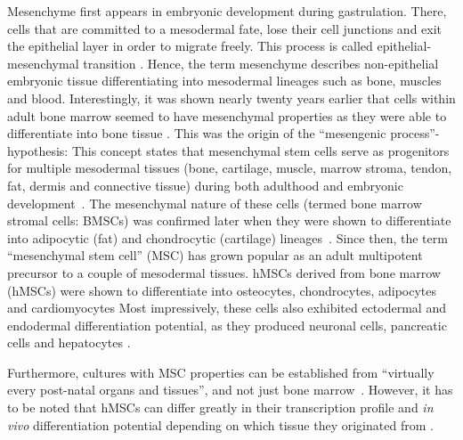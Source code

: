 Mesenchyme first appears in embryonic development during gastrulation.
There, cells that are committed to a mesodermal fate, lose their cell
junctions and exit the epithelial layer in order to migrate freely. This
process is called epithelial-mesenchymal transition
\cite{tamFormationMesodermalTissues1987,nowotschinCellularDynamicsEarly2010}.
Hence, the term mesenchyme describes non-epithelial embryonic tissue
differentiating into mesodermal lineages such as bone, muscles and
blood. Interestingly, it was shown nearly twenty years earlier that
cells within adult bone marrow seemed to have mesenchymal properties as
they were able to differentiate into bone tissue
\cite{friedensteinOsteogenesisTransplantsBone1966,friedensteinOsteogenicPrecursorCells1971,biancoMesenchymalStemCells2014}.
This was the origin of the ``mesengenic process''-hypothesis: This concept
states that mesenchymal stem cells serve as progenitors for multiple
mesodermal tissues (bone, cartilage, muscle, marrow stroma, tendon, fat,
dermis and connective tissue) during both adulthood and embryonic
development~\cite{caplanMesenchymalStemCells1991,caplanMesengenicProcess1994}. The mesenchymal nature of
these cells (termed bone marrow stromal cells: BMSCs) was confirmed
later when they were shown to differentiate into adipocytic (fat) and
chondrocytic (cartilage) lineages~\cite{pittengerMultilineagePotentialAdult1999}.
Since then, the
term ``mesenchymal stem cell'' (MSC) has grown popular as an adult
multipotent precursor to a couple of mesodermal tissues. hMSCs derived
from bone marrow (hMSCs) were shown to differentiate into osteocytes,
chondrocytes, adipocytes and cardiomyocytes
\cite{gronthosSTRO1FractionAdult1994,muruganandanAdipocyteDifferentiationBone2009,xuMesenchymalStemCells2004}
Most impressively, these cells also exhibited
ectodermal and endodermal differentiation potential, as they produced
neuronal cells, pancreatic cells and hepatocytes
\cite{barzilayLentiviralDeliveryLMX1a2009,wilkinsHumanBoneMarrowderived2009,gabrInsulinproducingCellsAdult2013,stockHumanBoneMarrow2014}.

Furthermore, cultures with MSC properties can be established from
``virtually every post-natal organs and tissues'', and not just bone
marrow~\cite{dasilvameirellesMesenchymalStemCells2006}. However, it has
to be noted that hMSCs can differ greatly in their transcription profile
and \textit{in vivo} differentiation potential depending on which tissue
they originated from
\cite{jansenFunctionalDifferencesMesenchymal2010,sacchettiNoIdenticalMesenchymal2016}.

